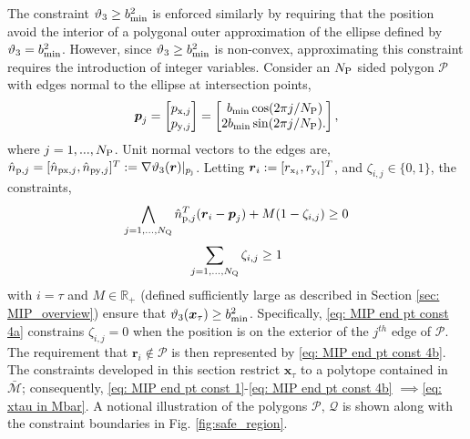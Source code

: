 \documentclass[twocolumn,letterpaper]{IEEEAerospaceCLS}  %
\theoremstyle{definition}
\begin{document}
 The constraint $\vartheta_3\geq b_{\rm min}^2$ is enforced similarly by requiring that the position avoid the interior of a polygonal outer approximation of the ellipse defined by $\vartheta_3= b_{\rm min}^2$. 
However, since $\vartheta_3\geq b_{\rm min}^2$ is non-convex, approximating this constraint requires the introduction of integer variables. 
Consider an $N_{\rm P}$ sided polygon $\mathcal{P}$ with edges normal to the ellipse at intersection points, 
\begin{equation*}
  \boldsymbol{p}_{j}
  =
  \begin{bmatrix}
  p_{{\rm x},j} \\
  p_{{\rm y},j}
  \end{bmatrix}
  = 
  \begin{bmatrix}
  \, b_{\rm min} \cos({2\pi j }/{N_{\rm P}}) \\ 
  2b_{\rm min} \sin({2\pi j }/{N_{\rm P}}). 
  \end{bmatrix}
  ,
\end{equation*}
where $j=1,...,N_{\rm P}$. 
Unit normal vectors to the edges are, 
$\hat{n}_{{\rm p},j} = [\hat{n}_{{\rm px},j} , \hat{n}_{{\rm py},j} ]^T := \nabla \vartheta_3(\boldsymbol{r})|_{p_{\rm j}}  $.  
Letting $\boldsymbol{r}_i:=[r_{{\rm x}_i}, r_{{\rm y}_i}]^T$, and $\zeta_{i,j} \in \{0,1\}$, the constraints, 
\begin{equation} \label{eq: MIP end pt const 4a}
  \bigwedge_{j=1,...,N_{\rm Q}} \hat{n}_{{\rm p},j}^T (\boldsymbol{r}_i-\boldsymbol{p}_j) + M(1-\zeta_{i,j}) \geq 0 
\end{equation}
\begin{equation} \label{eq: MIP end pt const 4b}
  \sum_{j=1,...,N_{\rm Q}} \zeta_{i,j} \geq 1 
\end{equation}
with $i=\tau$ and $M\in{\mathbb R}_{+}$ (defined sufficiently large as described in Section \ref{sec: MIP_overview}) ensure that $ \vartheta_3(\boldsymbol{x}_\tau) \geq b_{\rm min}^2 $. 
Specifically, \eqref{eq: MIP end pt const 4a} constrains $\zeta_{i,j}=0$ when the position is on the exterior of the $j^{th}$ edge of $\mathcal{P}$. 
The requirement that $\boldsymbol{r}_i\not\in\mathcal{P}$ is then represented by \eqref{eq: MIP end pt const 4b}. 
The constraints developed in this section restrict $\boldsymbol{x}_\tau$ to a polytope contained in $\bar{{\mathcal{M}}}$; consequently, \eqref{eq: MIP end pt const 1}-\eqref{eq: MIP end pt const 4b} $\implies$\eqref{eq: xtau in Mbar}.
A notional illustration of the polygons $\mathcal{P}, \, \mathcal{Q}$ is shown along with the constraint boundaries in Fig. \ref{fig:safe_region}. 
\end{document}
